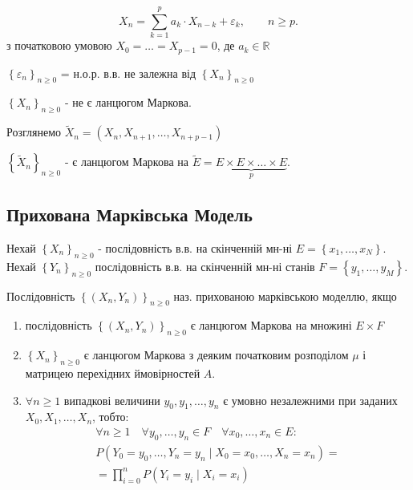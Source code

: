 \begin{example}
  \[
  X_n = \sum_{k=1}^{p} a_k \cdot X_{n-k} + \varepsilon_k, \qquad n \geq p
  .\] 
  з початковою умовою $X_0 = \ldots = X_{p-1} = 0$, де $a_k \in \mathbb{R}$

  $\left\{ \varepsilon_n \right\}_{n \geq 0}$ = н.о.р. в.в. не
  залежна від $\left\{ X_{n} \right\}_{n \geq 0}$

  $\left\{ X_{n} \right\}_{n \geq 0}$ - не є ланцюгом Маркова.

  Розглянемо $\widetilde{X}_{n} = \left( X_{n}, X_{n+1}, \ldots, X_{n+p-1} \right)$

  $\left\{ \widetilde{X}_{n} \right\}_{n \geq 0}$ - є ланцюгом Маркова на
  $\widetilde{E} = \underbrace{E \times E \times \ldots \times E}_{p}$.

\end{example}

\subsection{Прихована Марківська Модель}

Нехай $\left\{ X_{n} \right\}_{n \geq 0}$ - послідовність в.в. на скінченній мн-ні
$E = \left\{ x_1, \ldots, x_N \right\} $.
Нехай $\left\{ Y_n \right\}_{n \geq 0}$ послідовність в.в. на скінченній мн-ні станів
$F = \left\{ y_1, \ldots, y_{M} \right\} $.

\begin{definition}
  Послідовність $\left\{ \left( X_n, Y_n \right)  \right\}_{n \geq 0}$ наз. прихованою
  марківською моделлю, якщо
  \begin{enumerate}
    \item послідовність $\left\{ \left( X_n, Y_n \right)  \right\}_{n \geq 0}$ є ланцюгом Маркова
      на множині $E \times F$

    \item  $\left\{ X_n \right\}_{n \geq 0}$ є ланцюгом Маркова з деяким початковим розподілом
      $\mu$ і матрицею перехідних ймовірностей $A$.
    \item  $\forall n \geq 1$ випадкові величини  $y_0, y_1, \ldots, y_n$ є умовно
      незалежними при заданих $X_0, X_1, \ldots, X_n$, тобто:
      \begin{gather*}
      \forall n \geq 1 \quad \forall y_0, \ldots, y_n \in F \quad \forall x_0, \ldots, x_n \in E :\\
      P\left( Y_0 = y_0,\ldots, Y_n = y_n \mid X_0 = x_0,\ldots,X_n=x_n \right) = \\
      = \prod_{i=0}^{n} P\left( Y_i = y_i \mid X_i = x_i \right) 
      \end{gather*}
  \end{enumerate}
\end{definition}

